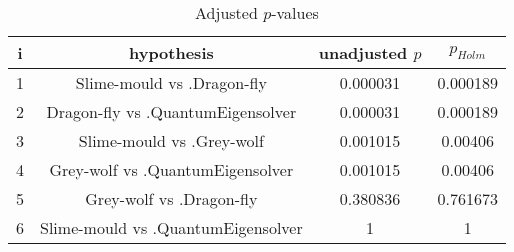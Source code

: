 \documentclass[a4paper,10pt]{article}
\begin{document}
\begin{landscape}
\begin{table}[!htp]
\centering\scriptsize
\begin{tabular}{cccc}
i&hypothesis&unadjusted $p$&$p_{Holm}$\\
\hline1&Slime-mould vs .Dragon-fly&0.000031&0.000189\\
2&Dragon-fly vs .QuantumEigensolver&0.000031&0.000189\\
3&Slime-mould vs .Grey-wolf&0.001015&0.00406\\
4&Grey-wolf vs .QuantumEigensolver&0.001015&0.00406\\
5&Grey-wolf vs .Dragon-fly&0.380836&0.761673\\
6&Slime-mould vs .QuantumEigensolver&1&1\\
\hline
\end{tabular}
\caption{Adjusted $p$-values}
\end{table}

\end{landscape}
\end{document}
